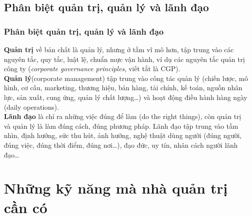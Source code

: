 \documentclass[10pt]{beamer}
\begin{document}
\subsection{Phân biệt quản trị, quản lý và lãnh đạo}

\begin{frame}
\transsplitverticalin
\frametitle{Phân biệt quản trị, quản lý và lãnh đạo}
\pause
\textbf{Quản trị} về bản chất là quản lý, nhưng ở tầm vĩ mô hơn, tập trung vào các nguyên tắc, quy tắc, luật lệ, chuẩn mực vận hành, ví dụ các nguyên tắc quản trị công ty (\emph{corporate governance principles}, viết tắt là CGP).\\
\pause
\vspace{10pt}
\textbf{Quản lý}(corporate management) tập trung vào công tác quản lý (chiến lược, mô hình, cơ cấu, marketing, thương hiệu, bán hàng, tài chính, kế toán, nguồn nhân lực, sản xuất, cung ứng, quản lý chất lượng…) và hoạt động điều hành hàng ngày (daily operations).\\
\pause
\vspace{10pt}
\textbf{Lãnh đạo} là chỉ ra những việc đúng để làm (do the right things), còn quản trị và quản lý là làm đúng cách, đúng phương pháp. Lãnh đạo tập trung vào tầm nhìn, định hướng, sức thu hút, ảnh hưởng, nghệ thuật dùng người (đúng người, đúng việc, đúng thời điểm, đúng nơi…), đạo đức, uy tín, nhân cách người lãnh đạo…\\

\pause

\end{frame}

\section{Những kỹ năng mà nhà quản trị cần có}
\end{document}
